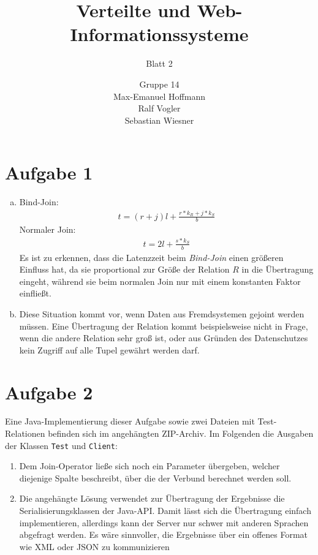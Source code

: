\documentclass[11pt,a4paper]{scrartcl}
\begin{document}
\author{Gruppe 14\\Max-Emanuel Hoffmann\\Ralf Vogler\\Sebastian Wiesner}
\title{Verteilte und Web-Informationssysteme}
\subtitle{Blatt 2}

\maketitle

\section*{Aufgabe 1}

\begin{enumerate}[a)]
\item Bind-Join:
\begin{align*}
t = (r + j)l + \frac{r*k_R + j*k_S}{b}
\end{align*}
Normaler Join:
\begin{align*}
t = 2l + \frac{s*k_S}{b}
\end{align*}
Es ist zu erkennen, dass die Latenzzeit beim \emph{Bind-Join} einen größeren
Einfluss hat, da sie proportional zur Größe der Relation $R$ in die Übertragung
eingeht, während sie beim normalen Join nur mit einem konstanten Faktor
einfließt.
\item Diese Situation kommt vor, wenn Daten aus Fremdsystemen gejoint werden
  müssen.  Eine Übertragung der Relation kommt beispielsweise nicht in Frage,
  wenn die andere Relation sehr groß ist, oder aus Gründen des Datenschutzes
  kein Zugriff auf alle Tupel gewährt werden darf.
\end{enumerate}

\section*{Aufgabe 2}

Eine Java-Implementierung dieser Aufgabe sowie zwei Dateien mit Test-Relationen
befinden sich im angehängten ZIP-Archiv.  Im Folgenden die Ausgaben der Klassen
\texttt{Test} und \texttt{Client}:

\begin{enumerate}
\item Dem Join-Operator ließe sich noch ein Parameter übergeben, welcher
  diejenige Spalte beschreibt, über die der Verbund berechnet werden soll.
\item Die angehängte Lösung verwendet zur Übertragung der Ergebnisse die
  Serialisierungsklassen der Java-API.  Damit lässt sich die Übertragung
  einfach implementieren, allerdings kann der Server nur schwer mit anderen
  Sprachen abgefragt werden.  Es wäre sinnvoller, die Ergebnisse über ein
  offenes Format wie XML oder JSON zu kommunizieren
\end{enumerate}
\end{document}
